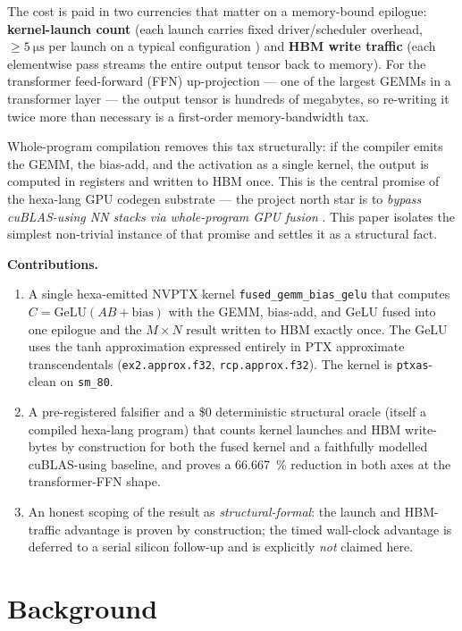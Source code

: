 \documentclass[11pt,a4paper]{article}
\begin{document}
The cost is paid in two currencies that matter on a memory-bound epilogue:
\textbf{kernel-launch count} (each launch carries fixed driver/scheduler
overhead, $\geq\SI{5}{\micro\second}$ per launch on a typical configuration
\citep{nvidia2024cuda}) and \textbf{HBM write traffic} (each elementwise pass
streams the entire output tensor back to memory). For the transformer
feed-forward (FFN) up-projection --- one of the largest GEMMs in a transformer
layer --- the output tensor is hundreds of megabytes, so re-writing it twice
more than necessary is a first-order memory-bandwidth tax.

Whole-program compilation removes this tax structurally: if the compiler emits
the GEMM, the bias-add, and the activation as a single kernel, the output is
computed in registers and written to HBM once. This is the central promise of
the hexa-lang GPU codegen substrate --- the project north star is to
\emph{bypass cuBLAS-using NN stacks via whole-program GPU fusion}
\citep{hexalang2026gpu}. This paper isolates the simplest non-trivial
instance of that promise and settles it as a structural fact.

\medskip
\noindent\textbf{Contributions.}
\begin{enumerate}\itemsep0.3em
\item A single hexa-emitted NVPTX kernel \texttt{fused\_gemm\_bias\_gelu} that
computes $C = \mathrm{GeLU}(AB + \mathrm{bias})$ with the GEMM, bias-add, and
GeLU fused into one epilogue and the $M\times N$ result written to HBM exactly
once. The GeLU uses the tanh approximation expressed entirely in PTX
approximate transcendentals (\texttt{ex2.approx.f32}, \texttt{rcp.approx.f32}).
The kernel is \texttt{ptxas}-clean on \texttt{sm\_80}.
\item A pre-registered falsifier and a \$0 deterministic structural oracle
(itself a compiled hexa-lang program) that counts kernel launches and HBM
write-bytes by construction for both the fused kernel and a faithfully modelled
cuBLAS-using baseline, and proves a \SI{66.667}{\percent} reduction in both
axes at the transformer-FFN shape.
\item An honest scoping of the result as \emph{structural-formal}: the launch
and HBM-traffic advantage is proven by construction; the timed wall-clock
advantage is deferred to a serial silicon follow-up and is explicitly
\emph{not} claimed here.
\end{enumerate}

\section{Background}
\label{sec:bg}
\end{document}
